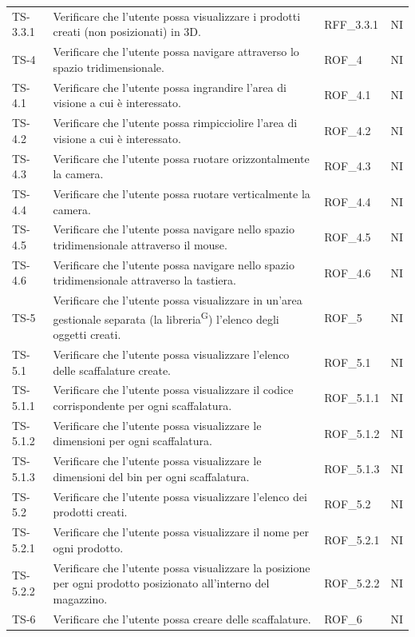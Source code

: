 \begin{xltabular}{0.9\textwidth}{X | p{0.5\textwidth} | X | X}
    TS-3.3.1 & Verificare che l'utente possa visualizzare i prodotti creati (non posizionati) in 3D. & RFF\_3.3.1& NI \\
    TS-4 & Verificare che l'utente possa navigare attraverso lo spazio tridimensionale. & ROF\_4& NI\\
    TS-4.1 & Verificare che l'utente possa ingrandire l'area di visione a cui è interessato. & ROF\_4.1& NI \\
    TS-4.2 & Verificare che l'utente possa rimpicciolire l'area di visione a cui è interessato. &  ROF\_4.2& NI \\
    TS-4.3 & Verificare che l'utente possa ruotare orizzontalmente la camera. & ROF\_4.3 & NI \\
    TS-4.4 & Verificare che l'utente possa ruotare verticalmente la camera. & ROF\_4.4& NI \\
    TS-4.5 & Verificare che l'utente possa navigare nello spazio tridimensionale attraverso il mouse. & ROF\_4.5& NI \\
    TS-4.6 & Verificare che l'utente possa navigare nello spazio tridimensionale attraverso la tastiera. & ROF\_4.6& NI\\
    TS-5 & Verificare che l'utente possa visualizzare in un'area gestionale separata (la libreria\textsuperscript{G}) l'elenco degli oggetti creati. & ROF\_5& NI \\
    TS-5.1 & Verificare che l'utente possa visualizzare l'elenco delle scaffalature create. & ROF\_5.1& NI \\
    TS-5.1.1 & Verificare che l'utente possa visualizzare il codice corrispondente per ogni scaffalatura. & ROF\_5.1.1& NI \\
    TS-5.1.2 & Verificare che l'utente possa visualizzare le dimensioni per ogni scaffalatura.& ROF\_5.1.2& NI \\
    TS-5.1.3 & Verificare che l'utente possa visualizzare le dimensioni del bin per ogni scaffalatura.& ROF\_5.1.3& NI\\
    TS-5.2 & Verificare che l'utente possa visualizzare l'elenco dei prodotti creati. & ROF\_5.2& NI \\
    TS-5.2.1 & Verificare che l'utente possa visualizzare il nome per ogni prodotto. & ROF\_5.2.1  & NI \\
    TS-5.2.2 & Verificare che l'utente possa visualizzare la posizione per ogni prodotto posizionato all'interno del magazzino. & ROF\_5.2.2& NI\\
    TS-6 & Verificare che l'utente possa creare delle scaffalature. & ROF\_6& NI\\

\end{xltabular}
